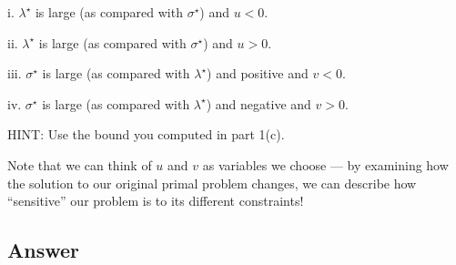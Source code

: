 \documentclass[
	12pt,
]{fphw}
\begin{document}
i. \(\lambda^\star\) is large (as compared with \(\sigma^\star\)) and \(u < 0\).

ii. \(\lambda^\star\) is large (as compared with \(\sigma^\star\)) and \(u > 0\).

iii. \(\sigma^\star\) is large (as compared with \(\lambda^\star\)) and positive and \(v < 0\).

iv. \(\sigma^\star\) is large (as compared with \(\lambda^\star\)) and negative and \(v > 0\).

HINT: Use the bound you computed in part 1(c).

Note that we can think of \(u\) and \(v\) as variables we choose — by examining how the solution to our original primal problem changes, we can describe how “sensitive” our problem is to its different constraints!

\subsection*{Answer}
\end{document}
